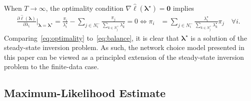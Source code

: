 When $T \to \infty$, the optimality condition $\nabla \hat{\ell} (\bm{\lambda}^\star) = \bm{0}$ implies
\begin{align}
\frac{\partial \hat{\ell}(\bm{\lambda})}{\partial \lambda_i} \bigg|_{\bm{\lambda} = \bm{\lambda}^\star}
    = \frac{\pi_i}{\lambda^\star_i} - \sum_{j \in N^-_i} \frac{\pi_j}{\sum_{k \in N^+_j} \lambda^\star_k} = 0
    \iff \pi_i &= \sum_{j \in N^-_i} \frac{\lambda^\star_i}{\sum_{k \in N^+_j} \lambda^\star_k} \pi_j \quad \forall i. \label{eq:optimality}
\end{align}
Comparing~\eqref{eq:optimality} to~\eqref{eq:balance}, it is clear that $\bm{\lambda}^\star$ is a solution of the steady-state inversion problem.
As such, the network choice model presented in this paper can be viewed as a principled extension of the steady-state inversion problem to the finite-data case.


\subsection{Maximum-Likelihood Estimate}
\label{sec:maxlik}

